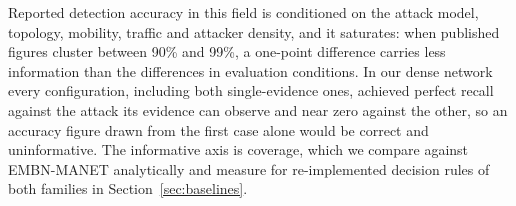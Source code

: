 Reported detection accuracy in this field is conditioned on the attack model,
topology, mobility, traffic and attacker density, and it saturates: when
published figures cluster between 90\% and 99\%, a one-point difference
carries less information than the differences in evaluation conditions. In
our dense network every configuration, including both single-evidence ones,
achieved perfect recall against the attack its evidence can observe and near
zero against the other, so an accuracy figure drawn from the first case alone
would be correct and uninformative. The informative axis is coverage, which we
compare against EMBN-MANET analytically and measure for re-implemented
decision rules of both families in Section~\ref{sec:baselines}.
